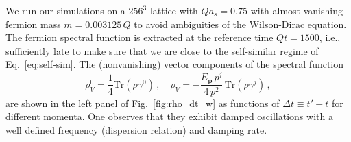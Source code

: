 \documentclass[]{webofc}
\def\be{\begin{equation}}
\def\ee{\end{equation}}
\newcommand{\mbf}{\mathbf}
\newcommand{\tpert}{t}
\newcommand{\Q}{Q}
\newcommand{\fig}{Fig.~}
\newcommand{\eq}{Eq.~}
\newcommand{\re}{Ref.~}
\newcommand{\pToFigs}{.}
\begin{document}
We run our simulations on a $256^3$ lattice with $\Q a_s = 0.75$  with almost vanishing fermion mass $m = 0.003125\,\Q$ to avoid ambiguities
of the Wilson-Dirac equation. The fermion spectral function is extracted at the reference time $\Q \tpert = 1500$, i.e., sufficiently late to make sure that we are close to the self-similar regime of \eq\eqref{eq:self-sim}. The (nonvanishing) vector components of the spectral function
\be
 \label{eq:rho_compon}
 \rho^{0}_{V}=\frac{1}{4} \text{Tr} (\rho \gamma^{0})\,, \quad
 \rho_{V}=- \frac{E_{\mbf p}\,p^{j}}{4\,p^2}\, \text{Tr} (\rho \gamma^{j})\,, 
\ee
are shown in the left panel of \fig\ref{fig:rho_dt_w} as functions of $\Delta t \equiv t'-t$ for different momenta. 
One observes that they exhibit damped oscillations with a well defined frequency (dispersion relation) and damping rate. 

\begin{comment}
\begin{figure}[t!]
 \centering
 \texttt{[image: \\pToFigs/Plot\_rhoDelta\_many\_N256Qa07n02\_new.pdf]}
 \caption{The spectral function $\rho_+(t,\omega,p) \equiv \rho_V^0 + \rho_V$ in frequency space for the momenta of \fig\ref{fig:rho_dt}. The values at negative frequency stem from $\rho_+(t,-\omega,p) = \rho_-(t,\omega,p) \equiv \rho_V^0 - \rho_V$. Figure taken from \re\cite{Boguslavski:2021kdd}.}
 \label{fig:rho_w}
\end{figure}
\end{comment}
\end{document}
